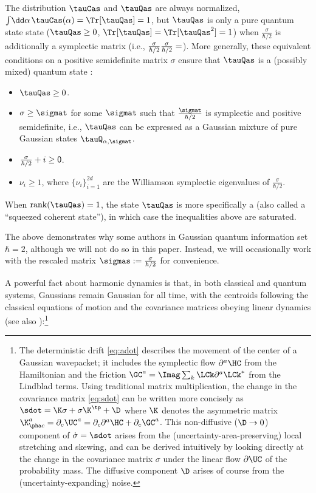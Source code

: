 \documentclass{article}
\numberwithin{equation}{section}
\begin{document}
The distribution $\tauCas$ and $\tauQas$ are always normalized, $\int\!\dd\alpha\,\tauCas(\alpha) = \Tr[\tauQas] = 1$, but $\tauQas$ is only a pure quantum state state ($\tauQas \ge 0$, $\Tr[\tauQas]=\Tr[\tauQas^2]=1$) when $\frac{\sigma}{\hbar/2}$ is additionally a symplectic matrix (i.e., $\frac{\sigma}{\hbar/2} \sf \frac{\sigma}{\hbar/2} = \sf$).  More generally, these equivalent conditions on a positive semidefinite matrix $\sigma$ ensure that $\tauQas$ is a (possibly mixed) quantum state \cite{simon1994quantumnoise,weedbrook2012gaussian}:
\begin{itemize}
\item $\tauQas \ge 0$.
\item $\sigma \ge \sigmat$ for some $\sigmat$ such that $\frac{\sigmat}{\hbar/2}$ is symplectic and positive semidefinite, i.e., $\tauQas$ can be expressed as a Gaussian mixture of pure Gaussian states $\tauQ_{\alpha, \sigmat}$.
\item $\frac{\sigma}{\hbar/2} + i\sf \ge 0$.
\item $\nu_i\ge 1$, where $\{\nu_i\}_{i=1}^{2d}$ are the Williamson symplectic eigenvalues \cite{williamson1936algebraic,ikramov2018symplectic} of $\frac{\sigma}{\hbar/2}$.
\end{itemize}
When $\text{rank}(\tauQas)=1$, the state $\tauQas$ is more specifically a  (also called a ``squeezed coherent state''), in which case the inequalities above are saturated. 

The above demonstrates why some authors in Gaussian quantum information set $\hbar=2$, although we will not do so in this paper.
Instead, we will occasionally work with the rescaled matrix $\sigmas := \frac{\sigma}{\hbar/2}$ for convenience.



A powerful fact about harmonic dynamics is that, in both classical and quantum systems, Gaussians remain Gaussian for all time, with the centroids following the classical equations of motion and the covariance matrices obeying linear dynamics \cite{isar1994open,brodier2004symplectic,graefe2018lindblad} (see also \cite{strunz1998classical, halliwell1995quantum}):\footnote{The deterministic drift \eqref{eq:adot} describes the movement of the center of a Gaussian wavepacket; it includes the symplectic flow $\partial^a \HC$ from the Hamiltonian and the friction $\GC^a = \Imag \sum_k \LCk \partial^a \LCk^*$ from the Lindblad terms. Using traditional matrix multiplication, the change in the covariance matrix \eqref{eq:sdot} can be written more concisely as 
$\sdot = \K\sigma+\sigma\K^\tp+\D$ 
where $\K$ denotes the asymmetric matrix $\K^{a}_{\pha c}=\partial_c\UC^a = \partial_c\partial^a \HC +\partial_c \GC^a$. This non-diffusive ($\D\to 0$) component of $\dot{\sigma} = \sdot$ arises from the (uncertainty-area-preserving) local stretching and skewing, and can be derived intuitively by looking directly at the change in the covariance matrix $\sigma$ under the linear flow $\partial\UC$ of the probability mass. The diffusive component $\D$ arises of course from the (uncertainty-expanding) noise.}
\end{document}
